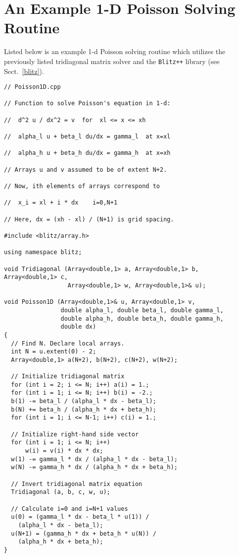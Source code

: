 \section{An Example 1-D Poisson Solving Routine}\label{poisson1d}
Listed below is an example 1-d Poisson solving routine
which utilizes the previously listed tridiagonal matrix
solver and the {\tt Blitz++} library (see Sect.~\ref{blitz}).
{\small\begin{verbatim}
// Poisson1D.cpp

// Function to solve Poisson's equation in 1-d:

//  d^2 u / dx^2 = v  for  xl <= x <= xh

//  alpha_l u + beta_l du/dx = gamma_l  at x=xl

//  alpha_h u + beta_h du/dx = gamma_h  at x=xh

// Arrays u and v assumed to be of extent N+2.

// Now, ith elements of arrays correspond to

//  x_i = xl + i * dx    i=0,N+1

// Here, dx = (xh - xl) / (N+1) is grid spacing.

#include <blitz/array.h>

using namespace blitz;

void Tridiagonal (Array<double,1> a, Array<double,1> b, Array<double,1> c, 
                  Array<double,1> w, Array<double,1>& u);

void Poisson1D (Array<double,1>& u, Array<double,1> v,
                double alpha_l, double beta_l, double gamma_l,
                double alpha_h, double beta_h, double gamma_h,
                double dx)
{
  // Find N. Declare local arrays.
  int N = u.extent(0) - 2;
  Array<double,1> a(N+2), b(N+2), c(N+2), w(N+2);

  // Initialize tridiagonal matrix
  for (int i = 2; i <= N; i++) a(i) = 1.;
  for (int i = 1; i <= N; i++) b(i) = -2.;
  b(1) -= beta_l / (alpha_l * dx - beta_l);
  b(N) += beta_h / (alpha_h * dx + beta_h);
  for (int i = 1; i <= N-1; i++) c(i) = 1.;

  // Initialize right-hand side vector
  for (int i = 1; i <= N; i++)
      w(i) = v(i) * dx * dx;
  w(1) -= gamma_l * dx / (alpha_l * dx - beta_l);
  w(N) -= gamma_h * dx / (alpha_h * dx + beta_h);

  // Invert tridiagonal matrix equation
  Tridiagonal (a, b, c, w, u);

  // Calculate i=0 and i=N+1 values
  u(0) = (gamma_l * dx - beta_l * u(1)) /
    (alpha_l * dx - beta_l);
  u(N+1) = (gamma_h * dx + beta_h * u(N)) /
    (alpha_h * dx + beta_h);
}
\end{verbatim}}


